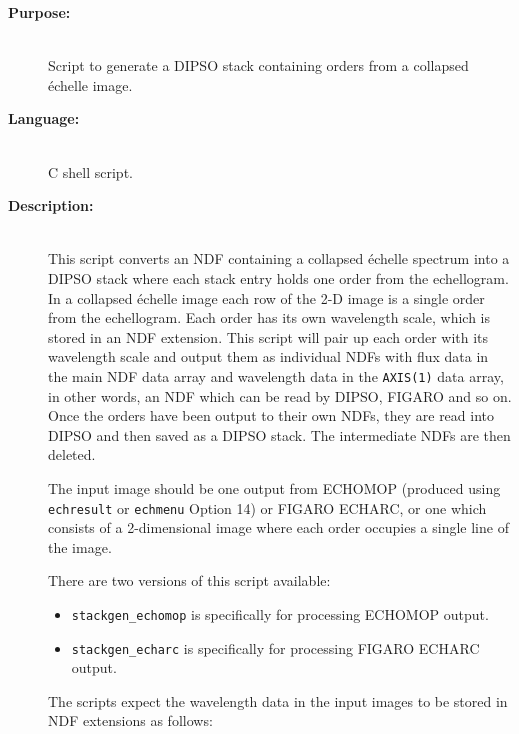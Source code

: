 \documentclass[twoside,11pt]{article}
\newcommand{\xref}[3]{#1}
\renewcommand{\_}{\texttt{\symbol{95}}}
\begin{document}
\begin{description}
\item [{\bf Purpose:}] \mbox{} \\
     Script to generate a \xref{DIPSO}{sun50}{} stack containing orders
     from a collapsed \'{e}chelle image.

\item [{\bf Language:}] \mbox{} \\
     C shell script.

\item [{\bf Description:}] \mbox{} \\
     This script converts an \xref{NDF}{sun33}{}
     containing a collapsed \'{e}chelle spectrum into a DIPSO stack where each
     stack entry holds one order from the echellogram.  In a collapsed
     \'{e}chelle image each row of the 2-D image is a single order from the
     echellogram.   Each order has its own wavelength scale, which is
     stored in an NDF extension.  This script will pair up each order
     with its wavelength scale and output them as individual NDFs with
     flux data in the main NDF data array and wavelength data in the
     \verb+AXIS(1)+ data array, in other words, an NDF which can be read by
     DIPSO, FIGARO and so on.  Once the orders have been output to their
     own NDFs, they are read into DIPSO and then saved as a DIPSO stack.
     The intermediate NDFs are then deleted.

     The input image should be one output from \xref{ECHOMOP}{sun152}{}
     (produced using \xref{{\tt ech\_result}}{sun152}{ech_result} or
     \xref{{\tt echmenu} Option 14}{sun152}{option14}) or FIGARO
     \xref{ECHARC}{sun86}{ECHARC}, or one which consists of a
     2-dimensional image where each order occupies a single line of the
     image.

     There are two versions of this script available:

\begin{itemize}

\item \verb+stackgen_echomop+ is specifically for processing ECHOMOP
      output.

\item \verb+stackgen_echarc+ is specifically for processing FIGARO ECHARC
      output.

\end{itemize}

     The scripts expect the wavelength data in the input images to be stored
     in NDF extensions as follows:


\end{description}
\end{document}
